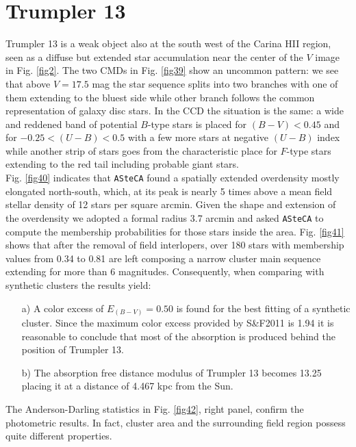 \documentclass{aa}
\begin{document}
\section{Trumpler 13}

Trumpler 13 is a weak object also at the south west of the Carina HII
region, seen as a diffuse but extended star accumulation near the center of the
$V$ image in Fig. \ref{fig2}. The two CMDs in Fig. \ref{fig39} show an uncommon
pattern: we see that above $V = 17.5$ mag the star sequence splits into two
branches with one of them extending to the bluest side while other branch
follows the common representation of galaxy disc stars.
In the CCD the situation is the same: a
wide and reddened band of potential $B$-type stars is placed for $(B-V)<0.45$
and for $-0.25<(U-B)<0.5$ with a few more stars at negative $(U-B)$ index
while another strip of stars goes from the characteristic place for $F$-type
stars extending to the red tail including probable giant stars.\\

Fig. \ref{fig40} indicates that \texttt{ASteCA} found a spatially extended
overdensity mostly elongated north-south, which, at its peak is nearly 5 times
above a mean field stellar density of 12 stars per square arcmin. Given the
shape and extension of the overdensity we adopted a formal radius 3.7 arcmin and
asked \texttt{ASteCA} to compute the membership probabilities for those stars
inside the area. Fig. \ref{fig41} shows that after the removal of field
interlopers, over 180 stars with membership values from 0.34 to 0.81 are left
composing a narrow cluster main sequence extending for more than 6 magnitudes.
Consequently, when comparing with synthetic clusters the results yield:

\begin{itemize}
\item [a)] A color excess of $E_{(B-V)}= 0.50$ is found for the best fitting of a
    synthetic cluster. Since the maximum color excess provided by S\&F2011
    is 1.94 it is reasonable to conclude that most of the absorption is produced
    behind the position of Trumpler 13.
\item [b)] The absorption free distance modulus of Trumpler 13 becomes 13.25
    placing it at a distance of 4.467 kpc from the Sun.
\end{itemize}

The Anderson-Darling statistics in Fig. \ref{fig42}, right panel, confirm the
photometric results. In fact, cluster area and the surrounding field region
possess quite different properties.\\
\end{document}
